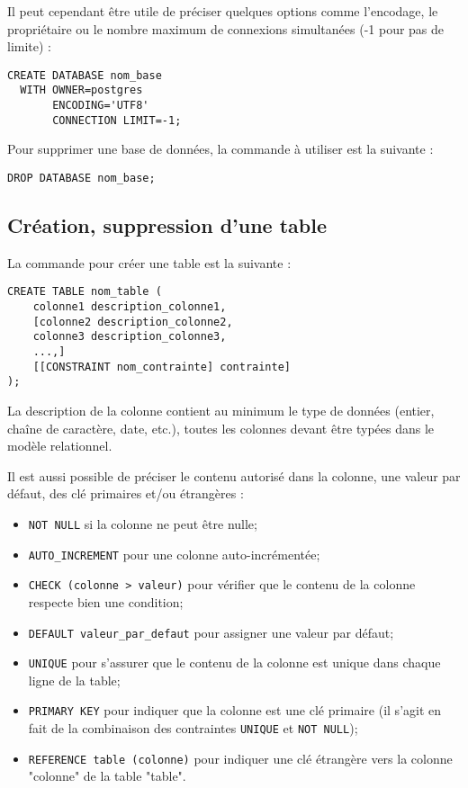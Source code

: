 \documentclass[11pt]{article}
\begin{document}
				Il peut cependant être utile de préciser quelques options comme l'encodage, le propriétaire ou le nombre maximum de connexions simultanées (-1 pour pas de limite) :
				\begin{lstlisting}
CREATE DATABASE nom_base
  WITH OWNER=postgres
       ENCODING='UTF8'
       CONNECTION LIMIT=-1;
			\end{lstlisting}
			
			Pour supprimer une base de données, la commande à utiliser est la suivante :
			\begin{lstlisting}
DROP DATABASE nom_base;
				\end{lstlisting}
				
				
				
			\subsection{Création, suppression d'une table}
				La commande pour créer une table est la suivante :
				\begin{lstlisting}
CREATE TABLE nom_table (
	colonne1 description_colonne1,
	[colonne2 description_colonne2,
	colonne3 description_colonne3,
	...,]
	[[CONSTRAINT nom_contrainte] contrainte]
);
				\end{lstlisting}
			
				La description de la colonne contient au minimum le type de données (entier, chaîne de caractère, date, etc.), toutes les colonnes devant être typées dans le modèle relationnel.
				
				Il est aussi possible de préciser le contenu autorisé dans la colonne, une valeur par défaut, des clé primaires et/ou étrangères :
				\begin{itemize}
					\item \lstinline{NOT NULL} si la colonne ne peut être nulle;
					\item \lstinline{AUTO_INCREMENT} pour une colonne auto-incrémentée;
					\item \lstinline{CHECK (colonne > valeur)} pour vérifier que le contenu de la colonne respecte bien une condition;
					\item \lstinline{DEFAULT valeur_par_defaut} pour assigner une valeur par défaut;
					\item \lstinline{UNIQUE} pour s'assurer que le contenu de la colonne est unique dans chaque ligne de la table;
					\item \lstinline{PRIMARY KEY} pour indiquer que la colonne est une clé primaire (il s'agit en fait de la combinaison des contraintes \lstinline{UNIQUE} et \lstinline{NOT NULL});
					\item \lstinline{REFERENCE table (colonne)} pour indiquer une clé étrangère vers la colonne "colonne" de la table "table".
				\end{itemize}
				
\end{document}
